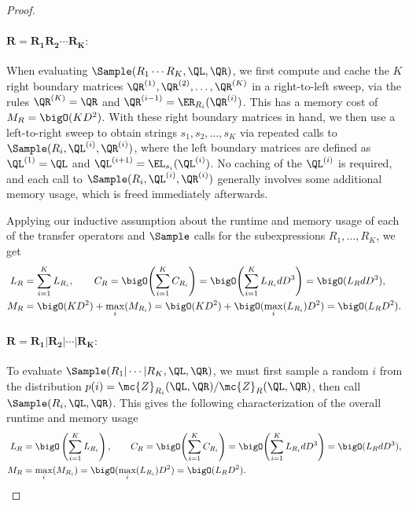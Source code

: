 \begin{proof}
\paragraph{$\mathbf{R = R_1 R_2 \cdots R_K:}$} When evaluating $\Sample(R_1 \cdots R_K, \QL, \QR)$, we first compute and cache the $K$ right boundary matrices $\QR^{(1)}, \QR^{(2)}, \ldots, \QR^{(K)}$ in a right-to-left sweep, via the rules $\QR^{(K)} = \QR$ and $\QR^{(i-1)} = \ER_{R_i}(\QR^{(i)})$. This has a memory cost of $M_R = \bigO(K D^2)$. With these right boundary matrices in hand, we then use a left-to-right sweep to obtain strings $s_1, s_2, \ldots, s_K$ via repeated calls to $\Sample(R_i, \QL^{(i)}, \QR^{(i)})$, where the left boundary matrices are defined as $\QL^{(1)} = \QL$ and $\QL^{(i+1)} = \EL_{s_i}(\QL^{(i)})$. No caching of the $\QL^{(i)}$ is required, and each call to $\Sample(R_i, \QL^{(i)}, \QR^{(i)})$ generally involves some additional memory usage, which is freed immediately afterwards. 

Applying our inductive assumption about the runtime and memory usage of each of the transfer operators and $\Sample$ calls for the subexpressions $R_1, \ldots, R_K$, we get
%
\begin{align*}
    L_R &= \sum_{i=1}^K L_{R_i}, \qquad C_R = \bigO\!\left(\sum_{i=1}^K C_{R_i}\right) = \bigO\!\left(\sum_{i=1}^K L_{R_i} d D^3\right) = \bigO(L_R d D^3), \\
    M_R &= \bigO(K D^2) + \max_{i}(M_{R_i}) = \bigO(K D^2) + \bigO(\max_i(L_{R_i})D^2) = \bigO(L_R D^2).
\end{align*}
%
\paragraph{$\mathbf{R = R_1 | R_2 | \cdots | R_K:}$} To evaluate $\Sample(R_1 | \cdots | R_K, \QL, \QR)$, we must first sample a random $i$ from the distribution $p(i) = \mc{Z}_{R_i}(\QL, \QR) / \mc{Z}_R(\QL, \QR)$, then call $\Sample(R_i, \QL, \QR)$. This gives the following characterization of the overall runtime and memory usage
%
\begin{align*}
    L_R &= \bigO\left(\sum_{i=1}^K L_{R_i}\right), \qquad C_R = \bigO\!\left(\sum_{i=1}^K C_{R_i}\right) = \bigO\!\left(\sum_{i=1}^K L_{R_i} d D^3\right) = \bigO(L_R d D^3), \\
    M_R &= \max_i(M_{R_i}) = \bigO(\max_i(L_{R_i}) D^2) = \bigO(L_R D^2).
\end{align*}

\end{proof}

